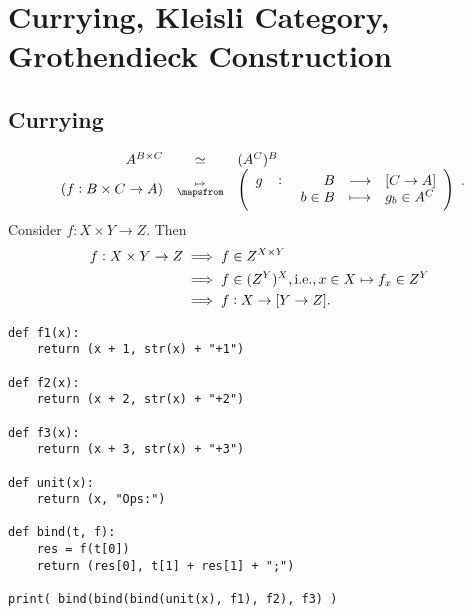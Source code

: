 \section{Currying, Kleisli Category, Grothendieck Construction}
\subsection{Currying}
\begin{note}
\[
\begin{array}{rcl}
	A^{B\times C}&\simeq &(A^C)^B \\
	(f:B\times C\to A)&\substack{\mapsto\\ \mapsfrom} &\left(\fullfunction{g}{B}{[C\to A]}{b\in B}{g_b\in A^C}\right)
\end{array}.
\] Consider $f:X\times Y\to Z$. Then\begin{align*}
	f:X\times Y\to Z&\implies f\in Z^{X\times Y} \\
	&\implies f\in (Z^{Y})^X, \textnormal{i.e.}, x\in X\mapsto f_x\in Z^Y \\
	&\implies f:X\to[Y\to Z].
\end{align*}
\end{note}

\begin{lstlisting}
def f1(x):
	return (x + 1, str(x) + "+1")

def f2(x):
	return (x + 2, str(x) + "+2")

def f3(x):
	return (x + 3, str(x) + "+3")

def unit(x):
	return (x, "Ops:")
	
def bind(t, f):
	res = f(t[0])
	return (res[0], t[1] + res[1] + ";")
	
print( bind(bind(bind(unit(x), f1), f2), f3) )
\end{lstlisting}


\newpage
